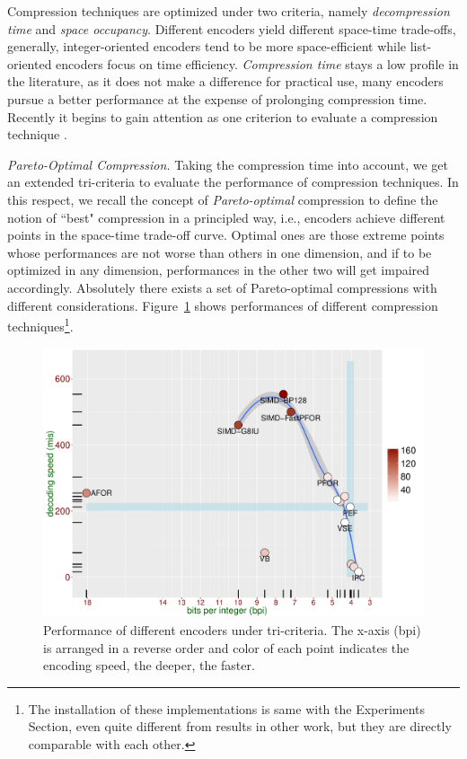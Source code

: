 \documentclass[runningheads,a4paper]{llncs}
\begin{document}
Compression techniques are optimized under two criteria, namely \textit{decompression time} and \textit{space occupancy}.
Different encoders yield different space-time trade-offs, generally, integer-oriented encoders tend to be more space-efficient while list-oriented encoders focus on time efficiency.
\textit{Compression time} stays a low profile in the literature, as it does not make a difference for practical use, many encoders pursue a better performance at the expense of prolonging compression time.
Recently it begins to gain attention as one criterion to evaluate a compression technique \cite{lemire2015decoding,ottaviano2015optimal}.

\textit{Pareto-Optimal Compression.}
Taking the compression time into account, we get an extended tri-criteria to evaluate the performance of compression techniques.
In this respect, we recall the concept of \textit{Pareto-optimal} compression to define the notion of ``best" compression in a principled way, i.e., encoders achieve different points in the space-time trade-off curve.
Optimal ones are those extreme points whose performances are not worse than others in one dimension, and if to be optimized in any dimension, performances in the other two will get impaired accordingly.
Absolutely there exists a set of Pareto-optimal compressions with different considerations.
Figure~\ref{fig:performance} shows performances of different compression techniques\footnote{The installation of these implementations is same with the Experiments Section, even quite different from results in other work, but they are directly comparable with each other.}.

\begin{figure}
	\centering
	\includegraphics[width=0.9\linewidth]{performance}
	\caption{Performance of different encoders under tri-criteria. The x-axis (bpi) is arranged in a reverse order and color of each point indicates the encoding speed, the deeper, the faster.}
	\label{fig:performance}
\end{figure}
\end{document}
